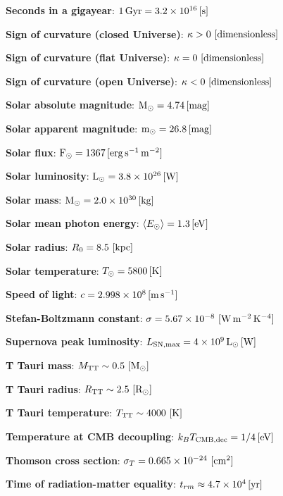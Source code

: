\documentclass[a4paper,10pt]{article}
\begin{document}
{\noindent}\textbf{Seconds in a gigayear}: $1\,{\rm Gyr} = 3.2\times10^{16}\,[{\rm s}]$

{\noindent}\textbf{Sign of curvature (closed Universe)}: $\kappa>0 ~ [{\rm dimensionless}]$

{\noindent}\textbf{Sign of curvature (flat Universe)}: $\kappa=0 ~ [{\rm dimensionless}]$

{\noindent}\textbf{Sign of curvature (open Universe)}: $\kappa<0 ~ [{\rm dimensionless}]$

{\noindent}\textbf{Solar absolute magnitude}: ${\rm M}_\odot = 4.74\,[{\rm mag}]$

{\noindent}\textbf{Solar apparent magnitude}: ${\rm m}_\odot = 26.8\,[{\rm mag}]$

{\noindent}\textbf{Solar flux}: ${\rm F}_\odot = 1367\,[{\rm erg\,s^{-1}\,m^{-2}}]$

{\noindent}\textbf{Solar luminosity}: ${\rm L}_\odot = 3.8\times10^{26}\,[{\rm W}]$

{\noindent}\textbf{Solar mass}: ${\rm M}_\odot = 2.0\times10^{30}\,[{\rm kg}]$

{\noindent}\textbf{Solar mean photon energy}: $\langle E_\odot \rangle = 1.3\,[{\rm eV}]$

{\noindent}\textbf{Solar radius}: $R_0 = 8.5 ~ [{\rm kpc}]$

{\noindent}\textbf{Solar temperature}: $T_\odot = 5800\,[{\rm K}]$

{\noindent}\textbf{Speed of light}: $c=2.998\times10^8\,[{\rm m\,s^{-1}}]$

{\noindent}\textbf{Stefan-Boltzmann constant}: $\sigma=5.67\times10^{-8} ~ [{\rm W\,m^{-2}\,K^{-4}}]$

{\noindent}\textbf{Supernova peak luminosity}: $L_\mathrm{SN,max} = 4\times10^9\,{\rm L_\odot}\,[{\rm W}]$

{\noindent}\textbf{T Tauri mass}: $M_{\rm TT}\sim0.5 ~ [{\rm M_\odot}]$

{\noindent}\textbf{T Tauri radius}: $R_{\rm TT}\sim2.5 ~ [{\rm R_\odot}]$

{\noindent}\textbf{T Tauri temperature}: $T_{\rm TT}\sim4000 ~ [{\rm K}]$

{\noindent}\textbf{Temperature at CMB decoupling}: $k_BT_\mathrm{CMB,dec} = 1/4\,[{\rm eV}]$

{\noindent}\textbf{Thomson cross section}: $\sigma_T=0.665\times10^{-24} ~ [{\rm cm^2}]$

{\noindent}\textbf{Time of radiation-matter equality}: $t_{rm} \approx 4.7\times10^{4}\,[{\rm yr}]$
\end{document}
